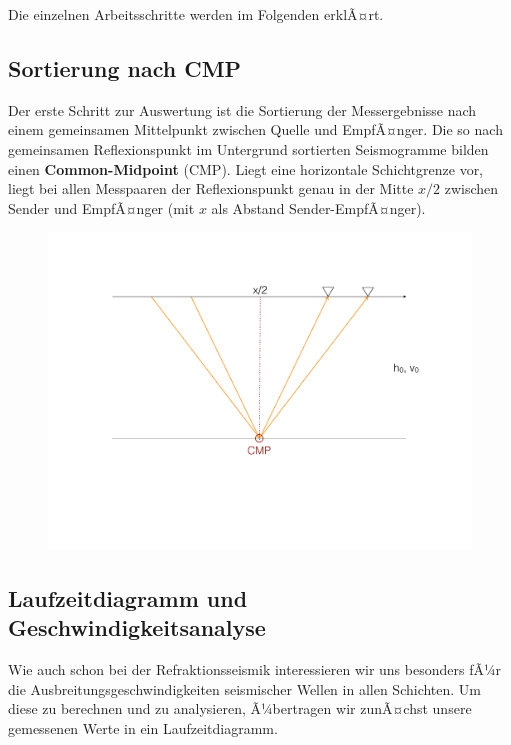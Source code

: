 Die einzelnen Arbeitsschritte werden im Folgenden erklÃ¤rt.


\subsection{Sortierung nach CMP}
Der erste Schritt zur Auswertung ist die Sortierung der Messergebnisse nach einem gemeinsamen Mittelpunkt zwischen Quelle und EmpfÃ¤nger. Die so nach gemeinsamen Reflexionspunkt im Untergrund sortierten Seismogramme bilden einen \textbf{Common-Midpoint} (CMP). Liegt eine horizontale Schichtgrenze vor, liegt bei allen Messpaaren der Reflexionspunkt genau in der Mitte $x/2$ zwischen Sender und EmpfÃ¤nger (mit $x$ als Abstand Sender-EmpfÃ¤nger).

\begin{figure}[H]
	\centering
	\includegraphics[width = \textwidth]{ReflexionsseismikBilder/CMPSortierung}
\end{figure}

\subsection{Laufzeitdiagramm und Geschwindigkeitsanalyse}
Wie auch schon bei der Refraktionsseismik interessieren wir uns besonders fÃ¼r die Ausbreitungsgeschwindigkeiten seismischer Wellen in allen Schichten. Um diese zu berechnen und zu analysieren, Ã¼bertragen wir zunÃ¤chst unsere gemessenen Werte in ein Laufzeitdiagramm. 

